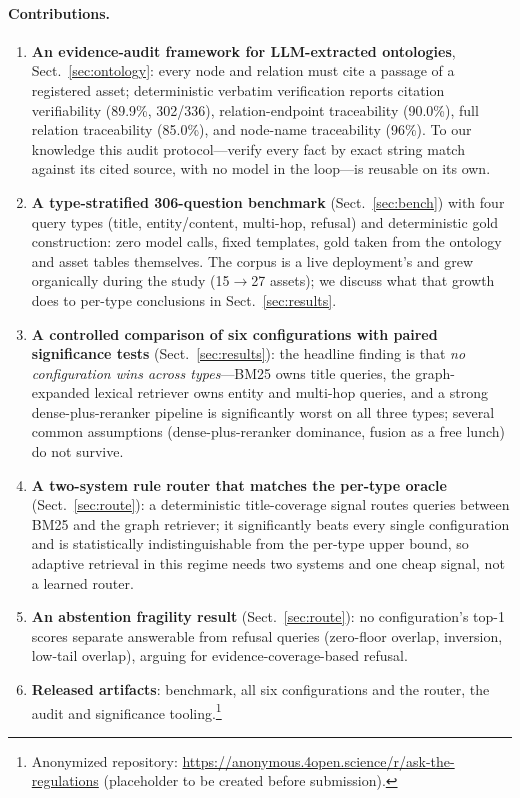 \documentclass[runningheads]{llncs}
\begin{document}
\paragraph{Contributions.}
\begin{enumerate}
\item \textbf{An evidence-audit framework for LLM-extracted ontologies},
Sect.~\ref{sec:ontology}: every node and relation must cite a passage of a
registered asset; deterministic verbatim verification reports citation
verifiability (89.9\%, 302/336), relation-endpoint traceability (90.0\%), full
relation traceability (85.0\%), and node-name traceability (96\%). To our
knowledge this audit protocol---verify every fact by exact string match
against its cited source, with no model in the loop---is reusable on its
own.
\item \textbf{A type-stratified 306-question benchmark} (Sect.~\ref{sec:bench})
with four query types (title, entity/content, multi-hop, refusal) and
deterministic gold construction: zero model calls, fixed templates, gold taken
from the ontology and asset tables themselves. The corpus is a live
deployment's and grew organically during the study (15$\to$27 assets); we
discuss what that growth does to per-type conclusions in Sect.~\ref{sec:results}.
\item \textbf{A controlled comparison of six configurations with paired
significance tests} (Sect.~\ref{sec:results}): the headline finding is that
\emph{no configuration wins across types}---BM25 owns title queries, the
graph-expanded lexical retriever owns entity and multi-hop queries, and a
strong dense-plus-reranker pipeline is significantly worst on all three types;
several common assumptions (dense-plus-reranker dominance, fusion as a free
lunch) do not survive.
\item \textbf{A two-system rule router that matches the per-type oracle}
(Sect.~\ref{sec:route}): a deterministic title-coverage signal routes queries
between BM25 and the graph retriever; it significantly beats every single
configuration and is statistically indistinguishable from the per-type upper
bound, so adaptive retrieval in this regime needs two systems and one cheap
signal, not a learned router.
\item \textbf{An abstention fragility result} (Sect.~\ref{sec:route}): no
configuration's top-1 scores separate answerable from refusal queries
(zero-floor overlap, inversion, low-tail overlap), arguing for
evidence-coverage-based refusal.
\item \textbf{Released artifacts}: benchmark, all six configurations and the
router, the audit and significance tooling.\footnote{Anonymized repository:
\url{https://anonymous.4open.science/r/ask-the-regulations} (placeholder to be
created before submission).}
\end{enumerate}
\end{document}
